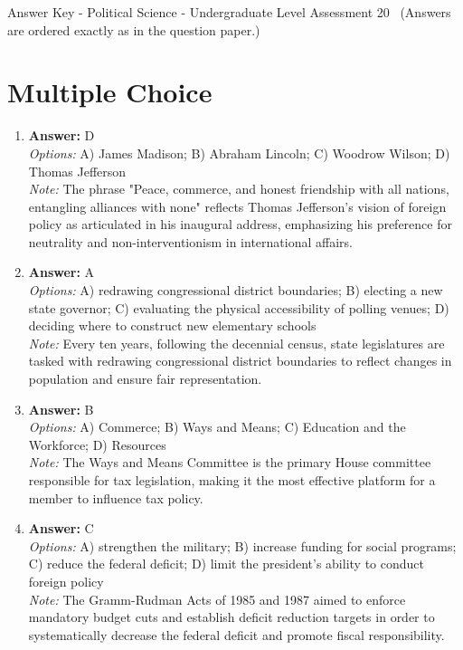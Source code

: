 \documentclass[12pt]{article}
\begin{document}
\begin{center}
Answer Key - Political Science - Undergraduate Level Assessment 20 \
\small (Answers are ordered exactly as in the question paper.)
\end{center}

\section*{Multiple Choice}
\begin{enumerate}[label=\arabic*.]
\item \textbf{Answer:} D
\\ \textit{Options:} A) James Madison; B) Abraham Lincoln; C) Woodrow Wilson; D) Thomas Jefferson
\\ \textit{Note:} The phrase "Peace, commerce, and honest friendship with all nations, entangling alliances with none" reflects Thomas Jefferson's vision of foreign policy as articulated in his inaugural address, emphasizing his preference for neutrality and non-interventionism in international affairs.
\item \textbf{Answer:} A
\\ \textit{Options:} A) redrawing congressional district boundaries; B) electing a new state governor; C) evaluating the physical accessibility of polling venues; D) deciding where to construct new elementary schools
\\ \textit{Note:} Every ten years, following the decennial census, state legislatures are tasked with redrawing congressional district boundaries to reflect changes in population and ensure fair representation.
\item \textbf{Answer:} B
\\ \textit{Options:} A) Commerce; B) Ways and Means; C) Education and the Workforce; D) Resources
\\ \textit{Note:} The Ways and Means Committee is the primary House committee responsible for tax legislation, making it the most effective platform for a member to influence tax policy.
\item \textbf{Answer:} C
\\ \textit{Options:} A) strengthen the military; B) increase funding for social programs; C) reduce the federal deficit; D) limit the president's ability to conduct foreign policy
\\ \textit{Note:} The Gramm-Rudman Acts of 1985 and 1987 aimed to enforce mandatory budget cuts and establish deficit reduction targets in order to systematically decrease the federal deficit and promote fiscal responsibility.

\end{enumerate}
\end{document}
